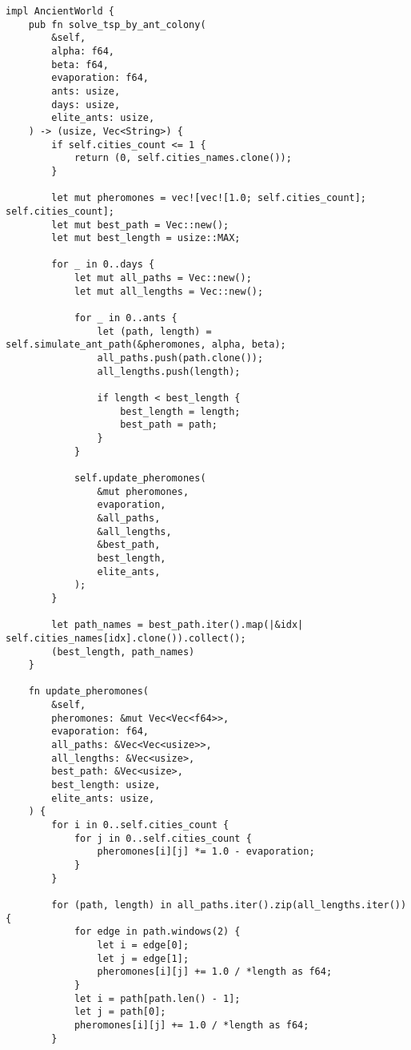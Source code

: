\begin{center}
\captionsetup{justification=raggedright,singlelinecheck=off}
\begin{lstlisting}[label=lst:ant_colony,caption=муравьиный алгоритм]
impl AncientWorld {
    pub fn solve_tsp_by_ant_colony(
        &self,
        alpha: f64,
        beta: f64,
        evaporation: f64,
        ants: usize,
        days: usize,
        elite_ants: usize,
    ) -> (usize, Vec<String>) {
        if self.cities_count <= 1 {
            return (0, self.cities_names.clone());
        }

        let mut pheromones = vec![vec![1.0; self.cities_count]; self.cities_count];
        let mut best_path = Vec::new();
        let mut best_length = usize::MAX;
    
        for _ in 0..days {
            let mut all_paths = Vec::new();
            let mut all_lengths = Vec::new();
    
            for _ in 0..ants {
                let (path, length) = self.simulate_ant_path(&pheromones, alpha, beta);
                all_paths.push(path.clone());
                all_lengths.push(length);
    
                if length < best_length {
                    best_length = length;
                    best_path = path;
                }
            }
    
            self.update_pheromones(
                &mut pheromones,
                evaporation,
                &all_paths,
                &all_lengths,
                &best_path,
                best_length,
                elite_ants,
            );
        }
    
        let path_names = best_path.iter().map(|&idx| self.cities_names[idx].clone()).collect();
        (best_length, path_names)
    }
    
    fn update_pheromones(
        &self,
        pheromones: &mut Vec<Vec<f64>>,
        evaporation: f64,
        all_paths: &Vec<Vec<usize>>,
        all_lengths: &Vec<usize>,
        best_path: &Vec<usize>,
        best_length: usize,
        elite_ants: usize,
    ) {
        for i in 0..self.cities_count {
            for j in 0..self.cities_count {
                pheromones[i][j] *= 1.0 - evaporation;
            }
        }
    
        for (path, length) in all_paths.iter().zip(all_lengths.iter()) {
            for edge in path.windows(2) {
                let i = edge[0];
                let j = edge[1];
                pheromones[i][j] += 1.0 / *length as f64;
            }
            let i = path[path.len() - 1];
            let j = path[0];
            pheromones[i][j] += 1.0 / *length as f64;
        }
    

\end{lstlisting}
\end{center}

